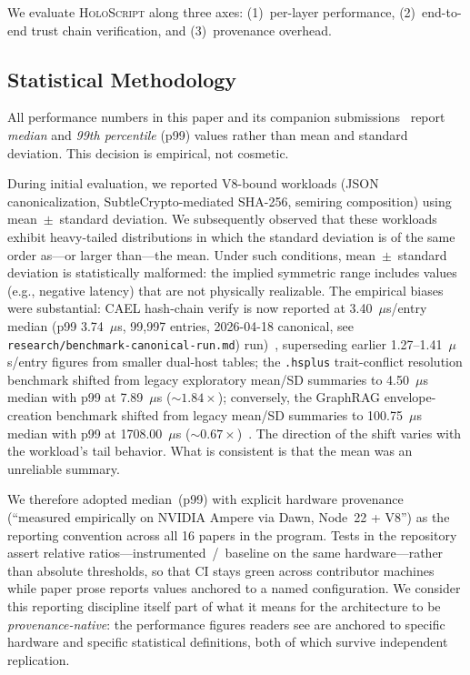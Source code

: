 \documentclass[sigchi-a]{acmart}
\newcommand{\holoscript}{\textsc{HoloScript}}
\begin{document}
We evaluate \holoscript{} along three axes: (1)~per-layer performance,
(2)~end-to-end trust chain verification, and (3)~provenance overhead.

\subsection{Statistical Methodology}
\label{sec:eval-methodology}

All performance numbers in this paper and its companion
submissions~\cite{trustbyconstruction2026,cael-paper,mcp-trust-paper,
snn-paper,crdt-paper,sandbox-paper,graphrag-paper} report
\emph{median} and \emph{99th percentile} (p99) values rather than mean
and standard deviation. This decision is empirical, not cosmetic.

During initial evaluation, we reported V8-bound workloads
(JSON canonicalization, SubtleCrypto-mediated SHA-256, semiring
composition) using mean~$\pm$~standard deviation. We subsequently
observed that these workloads exhibit heavy-tailed distributions in
which the standard deviation is of the same order as---or larger
than---the mean. Under such conditions, mean~$\pm$~standard deviation
is statistically malformed: the implied symmetric range includes
values (e.g., negative latency) that are not physically realizable.
The empirical biases were substantial: CAEL hash-chain verify is now reported
at 3.40~$\mu$s/entry median (p99 3.74~$\mu$s, 99{,}997 entries, 2026-04-18 canonical, see \texttt{research/benchmark-canonical-run.md})
run)~\cite{mcp-trust-paper}, superseding earlier 1.27--1.41~$\mu$s/entry figures from
smaller dual-host tables; the \texttt{.hsplus} trait-conflict
resolution benchmark shifted from legacy exploratory mean/SD summaries to
4.50~$\mu$s median with p99 at 7.89~$\mu$s (${\sim}1.84\times$);
conversely, the GraphRAG envelope-creation benchmark shifted from
legacy mean/SD summaries to 100.75~$\mu$s median with p99 at
1708.00~$\mu$s (${\sim}0.67\times$)~\cite{graphrag-paper}. The
direction of the shift varies with the workload's tail behavior.
What is consistent is that the mean was an unreliable summary.

We therefore adopted median~(p99) with explicit hardware provenance
(``measured empirically on NVIDIA Ampere via Dawn, Node~22 + V8'') as
the reporting convention across all 16 papers in the program. Tests
in the repository assert relative ratios---instrumented~/~baseline on
the same hardware---rather than absolute thresholds, so that CI stays
green across contributor machines while paper prose reports values
anchored to a named configuration. We consider this reporting
discipline itself part of what it means for the architecture to be
\emph{provenance-native}: the performance figures readers see are
anchored to specific hardware and specific statistical definitions,
both of which survive independent replication.
\end{document}
